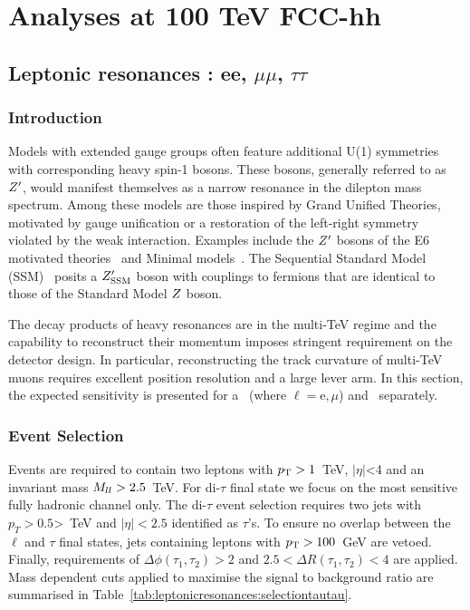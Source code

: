 \section{Analyses at 100 TeV FCC-hh}
\label{sec:ana100tev}

\subsection{Leptonic resonances : ee, \texorpdfstring{$\mu\mu$}{uu}, \texorpdfstring{$\tau\tau$}{tt}}
\label{subsec:lepreso}

\subsubsection{Introduction}
Models with extended gauge groups often feature additional U(1) symmetries with corresponding heavy spin-1 bosons. These bosons, generally referred to as $Z^{\prime}$, would manifest themselves as a narrow resonance in the dilepton mass spectrum. Among these models are those inspired by Grand Unified Theories, motivated by gauge unification or a restoration of the left-right symmetry violated by the weak interaction. Examples include the $Z^{\prime}$ bosons of the E6 motivated theories~\cite{London:1986jz,Joglekar:2016yap,Langacker:2008yv} and Minimal models~\cite{Salvioni:2009mt}. The Sequential Standard Model (SSM)~\cite{Langacker:2008yv} posits a $Z^{\prime}_{\mathrm{SSM}}$ boson with couplings to fermions that are identical to those of the Standard Model $Z$ boson.

The decay products of heavy resonances are in the multi-TeV regime and the capability to reconstruct their momentum imposes stringent requirement on the detector design. In particular, reconstructing the track curvature of multi-TeV muons requires excellent position resolution and a large lever arm. In this section, the expected sensitivity is presented for a \Zpll\ (where $\ell=\mathrm{e},\mu$) and \Zptata\ separately.

\subsubsection{Event Selection}
Events are required to contain two leptons with $p_{\text{T}} > 1$~TeV, $|\eta|$<4 and an invariant mass $M_{ll} > 2.5$~TeV. For di-$\tau$ final state we focus on the most sensitive fully hadronic channel only. The di-$\tau$ event selection requires two jets with $p_{T} > 0.5$>~TeV and $|\eta|<2.5$ identified as $\tau$'s. To ensure no overlap between the $\ell$ and $\tau$ final states, jets containing leptons with $p_{\text{T}} > 100$~GeV are vetoed. Finally, requirements of $\Delta \phi(\tau_1, \tau_2)> 2$ and $2.5<\Delta R(\tau_1, \tau_2)<4$ are applied.
Mass dependent cuts applied to maximise the signal to background ratio are summarised in Table~\ref{tab:leptonicresonances:selectiontautau}.

